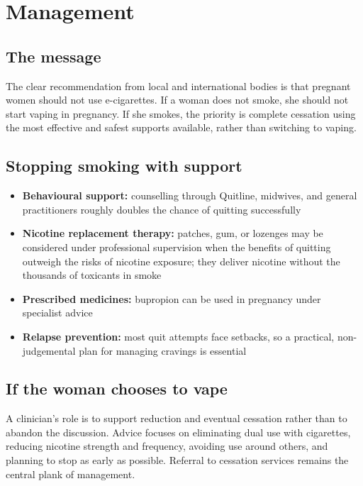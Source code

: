 \section*{Management}
\subsection*{The message}
The clear recommendation from local and international bodies is that pregnant women should not use e-cigarettes. If a woman does not smoke, she should not start vaping in pregnancy. If she smokes, the priority is complete cessation using the most effective and safest supports available, rather than switching to vaping.

\subsection*{Stopping smoking with support}
\begin{itemize}
    \item \textbf{Behavioural support:} counselling through Quitline, midwives, and general practitioners roughly doubles the chance of quitting successfully
    \item \textbf{Nicotine replacement therapy:} patches, gum, or lozenges may be considered under professional supervision when the benefits of quitting outweigh the risks of nicotine exposure; they deliver nicotine without the thousands of toxicants in smoke
    \item \textbf{Prescribed medicines:} bupropion can be used in pregnancy under specialist advice
    \item \textbf{Relapse prevention:} most quit attempts face setbacks, so a practical, non-judgemental plan for managing cravings is essential
\end{itemize}

\subsection*{If the woman chooses to vape}
A clinician's role is to support reduction and eventual cessation rather than to abandon the discussion. Advice focuses on eliminating dual use with cigarettes, reducing nicotine strength and frequency, avoiding use around others, and planning to stop as early as possible. Referral to cessation services remains the central plank of management.

